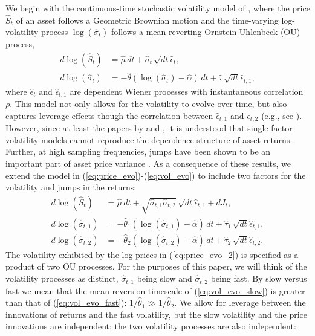 We begin with the continuous-time stochastic volatility model of \cite{hull1987pricing}, where the price $\hat{S}_t$ of an asset follows a Geometric Brownian motion and the time-varying log-volatility process $\log(\hat{\sigma}_t)$ follows a mean-reverting Ornstein-Uhlenbeck (OU) process,
\begin{align}
  d\log(\hat{S}_t) &= \hat{\mu}\, dt + \hat{\sigma}_t\, \sqrt{dt} \hat{\epsilon}_{t}  ,  \label{eq:price_evo} \\
  d\log( \hat{ \sigma }_t) &= -\hat{\theta} ( \log(\hat{\sigma}_t ) - \hat{\alpha} )\, dt + \hat{\tau}\, \sqrt{dt} \hat{\epsilon}_{t,1}  ,  \label{eq:vol_evo}
\end{align}
where $\hat{\epsilon}_{t}$ and $\hat{\epsilon}_{t,1}$ are dependent Wiener processes with instantaneous correlation $\rho$.  This model not only allows for the volatility to evolve over time, but also captures leverage effects though the correlation between $\hat{\epsilon}_{t,1}$ and $\hat{\epsilon}_{t,2}$ (e.g., see \cite{black1976pricing}). However, since at least the papers by \cite{barndorff2001multifactor} and \cite{chernov2003alternative}, it is understood that single-factor volatility models cannot reproduce the dependence structure of asset returns. Further, at high sampling frequencies, jumps have been shown to be an important part of asset price variance \citep{huang2005relative}. As a consequence of these results, we extend the model in (\ref{eq:price_evo})-(\ref{eq:vol_evo}) to include two factors for the volatility and jumps in the returns:
\begin{align}
  d\log(\hat{S}_t) &= \hat{\mu}\, dt + \sqrt{\hat{\sigma}_{t,1} \hat{\sigma}_{t,2}}\, \sqrt{dt} \hat{\epsilon}_{t,1} + dJ_t  ,   \label{eq:price_evo_2}\\
  d\log( \hat{ \sigma }_{t,1}) &= -\hat{\theta}_1 ( \log(\hat{\sigma}_{t,1} ) - \hat{\alpha} )\, dt + \hat{\tau}_1\, \sqrt{dt} \hat{\epsilon}_{t,1}  , \label{eq:vol_evo_slow} \\
  d\log( \hat{ \sigma }_{t,2}) &= -\hat{\theta}_2 ( \log(\hat{\sigma}_{t,2} ) - \hat{\alpha} )\, dt + \hat{\tau}_2\, \sqrt{dt} \hat{\epsilon}_{t,2}  . \label{eq:vol_evo_fast}
\end{align}
The volatility exhibited by the log-prices in (\ref{eq:price_evo_2}) is specified as a product of two OU processes. For the purposes of this paper, we will think of the volatility processes as distinct, $\hat{\sigma}_{t,1}$ being slow and $\hat{\sigma}_{t,2}$ being fast. By slow versus fast we mean that the mean-reversion timescale of (\ref{eq:vol_evo_slow}) is greater than that of (\ref{eq:vol_evo_fast}): $1/\hat{\theta}_1 \gg 1/\hat{\theta}_2$. We allow for leverage between the innovations of returns and the fast volatility, but the slow volatility and the price innovations are independent; the two volatility processes are also independent:
